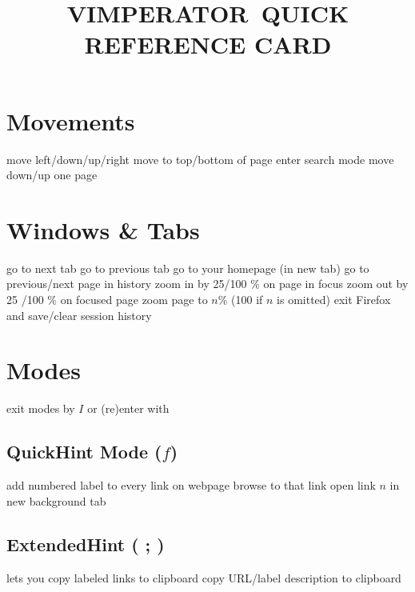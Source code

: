 
\def\content{VIMPERATOR}
\def\versionnumber{0.1}  %
\def\year{2014}
\def\month{Jun}
\def\version{v\versionnumber\ \month\ \year}




\title{\uppercase{\content\ quick reference card}}

\shortintro

\vskip 0.5cm

\section{Movements}{}
	{move left/down/up/right}
	{move to top/bottom of page}
\cmdS{/}	{enter search mode}
\cmdS{\space~\shift\space}	{move down/up one page}

\section{Windows \& Tabs}{}
	{go to next tab}
	{go to previous tab}
	{go to your homepage (in new tab)}
	{go to previous/next page in history}
	{zoom in by 25/100 \% on page in focus}
	{zoom out by 25 /100 \% on focused page}
	{zoom page to $n$\% (100 if $n$ is omitted)}
	{exit Firefox and save/clear session history}

\section{Modes}{exit modes by $I$ or (re)enter with }
\subsection{QuickHint Mode ($f$)}{add numbered label to every link on webpage}
	{browse to that link}
	{open link $n$ in new background tab}
\subsection{ExtendedHint ( ; )}{lets you copy labeled links to clipboard}
	{copy URL/label description to clipboard}

